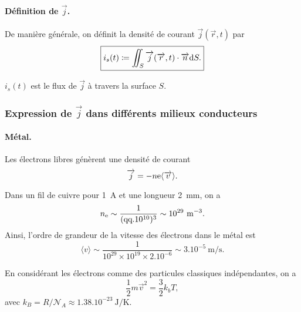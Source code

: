             \paragraph{Définition de $\vec{j}$.}

                De manière générale, on définit la densité de courant $\vec{j}(\vec{r},t)$ par 
                \begin{equation}
                    \boxed{
                        i_s(t)\coloneqq\iint_{S}\protect\overrightarrow{{j}}(\protect\overrightarrow{{r}},t)\cdot\protect\overrightarrow{{n}}\mathrm{d} S.
                    }
                \end{equation}

                $i_s(t)$ est le flux de $\vec{j}$ à travers la surface $S$.

        \subsubsection{Expression de $\vec{j}$ dans différents milieux conducteurs}

            \paragraph{Métal.} 
            
                Les électrons libres génèrent une densité de courant 
                \begin{equation}
                    \protect\overrightarrow{{j}}=-n\mathrm{e} \langle \protect\overrightarrow{{v}}\rangle.
                \end{equation}

                Dans un fil de cuivre pour 1~\si{\ampere} et une longueur 2~\si{\milli\metre}, on a 
                \begin{equation}
                    n_{\mathrm{e}}\sim\frac{1}{(\text{qq}.10^{10})^{3}}\sim 10^{29}~\si{\per\metre\cubed}.
                \end{equation}
                Ainsi, l'ordre de grandeur de la vitesse des électrons dans le métal est 
                \begin{equation}
                    \langle v\rangle \sim \frac{1}{10^{29}\times10^{19}\times 2.10^{-6}}\sim3.10^{-5}~\si{\metre\per\second}.
                \end{equation}

                En considérant les électrons comme des particules classiques indépendantes, on a 
                \begin{equation}
                    \frac{1}{2}m\vec{v}^{2}=\frac{3}{2}k_b T,
                \end{equation}
                avec $k_B=R/\mathcal{N}_A\approx 1.38.10^{-23}~\si{\joule\per\kelvin}$.

